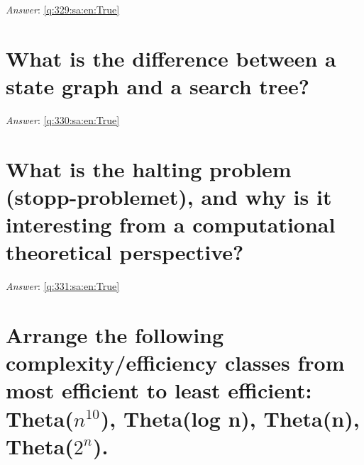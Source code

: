 \documentclass[a4paper,11pt,oneside]{book}
\begin{document}
\begin{sloppypar}
\label{q:329:sa:en:False}

\vspace{2cm}

\noindent\makebox[\textwidth]{\hrulefill}

\vspace{1cm}

\textit{Answer}: \autoref{q:329:sa:en:True}



\section{What is the difference between a state graph and a search tree?}

\label{q:330:sa:en:False}

\vspace{2cm}

\noindent\makebox[\textwidth]{\hrulefill}

\vspace{1cm}

\textit{Answer}: \autoref{q:330:sa:en:True}



\section{What is the halting problem (stopp-problemet), and why is it interesting from a computational theoretical perspective?}

\label{q:331:sa:en:False}

\vspace{2cm}

\noindent\makebox[\textwidth]{\hrulefill}

\vspace{1cm}

\textit{Answer}: \autoref{q:331:sa:en:True}



\section{Arrange the following complexity/efficiency classes from most efficient to least efficient: Theta($n^10$), Theta(log n), Theta(n), Theta($2^n$).}

\label{q:332:sa:en:False}

\vspace{2cm}

\noindent\makebox[\textwidth]{\hrulefill}


\end{sloppypar}
\end{document}
